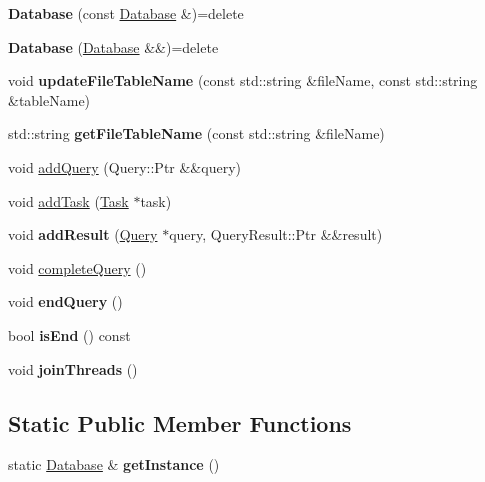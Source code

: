 \begin{DoxyCompactItemize}
\mbox{\label{class_database_a83f8b6d2941a4aee50f225e08e97291c}} 
{\bfseries Database} (const \hyperlink{class_database}{Database} \&)=delete
\item 
\mbox{\label{class_database_a00d16c8b373c9bb4bad59550648c5393}} 
{\bfseries Database} (\hyperlink{class_database}{Database} \&\&)=delete
\item 
\mbox{\label{class_database_acd5776560ea4d5ab583cceea209bb721}} 
void {\bfseries update\+File\+Table\+Name} (const std\+::string \&file\+Name, const std\+::string \&table\+Name)
\item 
\mbox{\label{class_database_a7819fe58fa0cc1bd3fd35b053be46895}} 
std\+::string {\bfseries get\+File\+Table\+Name} (const std\+::string \&file\+Name)
\item 
void \hyperlink{class_database_a537758fac6907e4d0f5e136a5c894a3d}{add\+Query} (Query\+::\+Ptr \&\&query)
\item 
void \hyperlink{class_database_a49110ec81b4011c47011ef3b0a348a70}{add\+Task} (\hyperlink{class_task}{Task} $\ast$task)
\item 
\mbox{\label{class_database_a3821a8fc52aac97e6cfda234bc257c97}} 
void {\bfseries add\+Result} (\hyperlink{class_query}{Query} $\ast$query, Query\+Result\+::\+Ptr \&\&result)
\item 
void \hyperlink{class_database_a55858cf28c9a4118ac97bdc9a1abf981}{complete\+Query} ()
\item 
\mbox{\label{class_database_afbab61ba6d854b086cbe46b9921408f4}} 
void {\bfseries end\+Query} ()
\item 
\mbox{\label{class_database_a45c9bb61f3ca877def1c97651e1f5a3d}} 
bool {\bfseries is\+End} () const
\item 
\mbox{\label{class_database_ac7de0114f3bbe1d269a57c398696ecfb}} 
void {\bfseries join\+Threads} ()
\end{DoxyCompactItemize}
\subsection*{Static Public Member Functions}
\begin{DoxyCompactItemize}
\item 
\mbox{\label{class_database_a317c583698e8c788b146144de307df7e}} 
static \hyperlink{class_database}{Database} \& {\bfseries get\+Instance} ()
\end{DoxyCompactItemize}


